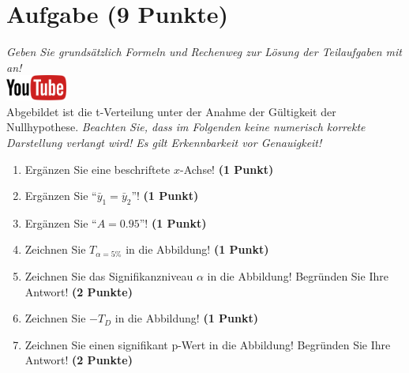 \documentclass[a4paper, 9pt]{scrartcl}\usepackage[]{graphicx}\usepackage[]{xcolor}
\begin{document}
 
\clearpage

\section{Aufgabe \hfill (9 Punkte)}

\textit{Geben Sie grunds{\"a}tzlich Formeln und Rechenweg zur L{\"o}sung der
  Teilaufgaben mit an!} \\[1Ex]

\hfill\href{https://youtu.be/32JjH1eyuTU}{\includegraphics[width =
  2cm]{img/youtube}}\\[1Ex]



Abgebildet ist die t-Verteilung unter der Anahme der G{\"u}ltigkeit der
Nullhypothese. \textit{Beachten Sie, dass im Folgenden keine
  numerisch korrekte Darstellung verlangt wird! Es gilt Erkennbarkeit vor
  Genauigkeit!}

\begin{enumerate}
\item Erg{\"a}nzen Sie eine beschriftete $x$-Achse! \textbf{(1 Punkt)}
\item Erg{\"a}nzen Sie "`$\bar{y}_1 = \bar{y}_2$"'! \textbf{(1 Punkt)} 
\item Erg{\"a}nzen Sie "`$A = 0.95$"'! \textbf{(1 Punkt)}
\item Zeichnen Sie $T_{\alpha=5\%}$ in die Abbildung! \textbf{(1 Punkt)} 
\item Zeichnen Sie das Signifikanzniveau $\alpha$ in die Abbildung! Begr{\"u}nden
  Sie Ihre Antwort! \textbf{(2 Punkte)} 
\item Zeichnen Sie $-T_{D}$ in die Abbildung! \textbf{(1
    Punkt)}
\item Zeichnen Sie einen signifikant p-Wert in die Abbildung! Begr{\"u}nden
  Sie Ihre Antwort! \textbf{(2 Punkte)}   
\end{enumerate}
\end{document}
